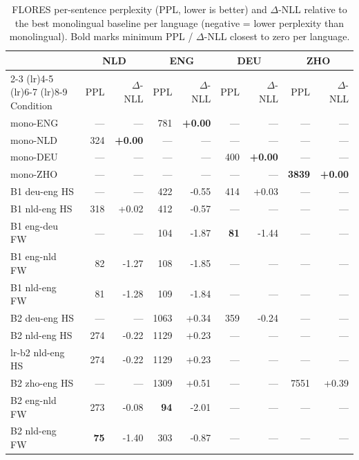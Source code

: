 \begin{table}[t]
  \centering
  \tiny
  \caption{FLORES per-sentence perplexity (PPL, lower is better) and
           $\Delta$-NLL relative to the best monolingual baseline per language
           (negative = lower perplexity than monolingual).
           Bold marks minimum PPL / $\Delta$-NLL closest to zero per language.}
  \label{tab:flores_ppl}
  \begin{tabular}{lrrrrrrrr}
    \toprule
    & \multicolumn{2}{c}{NLD} & \multicolumn{2}{c}{ENG} & \multicolumn{2}{c}{DEU} & \multicolumn{2}{c}{ZHO} \\
    \cmidrule(lr){2-3} \cmidrule(lr){4-5} \cmidrule(lr){6-7} \cmidrule(lr){8-9}
    Condition & PPL & $\Delta$-NLL & PPL & $\Delta$-NLL & PPL & $\Delta$-NLL & PPL & $\Delta$-NLL \\
    \midrule
    mono-ENG & --- & --- & 781 & \textbf{+0.00} & --- & --- & --- & --- \\
    mono-NLD & 324 & \textbf{+0.00} & --- & --- & --- & --- & --- & --- \\
    mono-DEU & --- & --- & --- & --- & 400 & \textbf{+0.00} & --- & --- \\
    mono-ZHO & --- & --- & --- & --- & --- & --- & \textbf{3839} & \textbf{+0.00} \\
    B1 deu-eng HS & --- & --- & 422 & -0.55 & 414 & +0.03 & --- & --- \\
    B1 nld-eng HS & 318 & +0.02 & 412 & -0.57 & --- & --- & --- & --- \\
    B1 eng-deu FW & --- & --- & 104 & -1.87 & \textbf{81} & -1.44 & --- & --- \\
    B1 eng-nld FW & 82 & -1.27 & 108 & -1.85 & --- & --- & --- & --- \\
    B1 nld-eng FW & 81 & -1.28 & 109 & -1.84 & --- & --- & --- & --- \\
    B2 deu-eng HS & --- & --- & 1063 & +0.34 & 359 & -0.24 & --- & --- \\
    B2 nld-eng HS & 274 & -0.22 & 1129 & +0.23 & --- & --- & --- & --- \\
    lr-b2 nld-eng HS & 274 & -0.22 & 1129 & +0.23 & --- & --- & --- & --- \\
    B2 zho-eng HS & --- & --- & 1309 & +0.51 & --- & --- & 7551 & +0.39 \\
    B2 eng-nld FW & 273 & -0.08 & \textbf{94} & -2.01 & --- & --- & --- & --- \\
    B2 nld-eng FW & \textbf{75} & -1.40 & 303 & -0.87 & --- & --- & --- & --- \\

\end{tabular}
\end{table}
